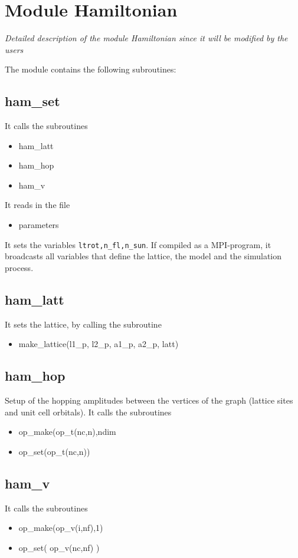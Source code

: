\section{Module Hamiltonian}
\textit{Detailed description of the module Hamiltonian since it will be modified by the users}

The module contains the following subroutines:
\subsection{ham\_set}
It calls the subroutines
\begin{itemize}
\item ham\_latt
\item ham\_hop
\item ham\_v
\end{itemize}
It reads in the file
\begin{itemize}
\item parameters
\end{itemize}
It sets the variables {\tt ltrot,n\_fl,n\_sun}.
If compiled as a MPI-program, it broadcasts all variables that define the lattice, the model and the simulation process.


\subsection{ham\_latt}
It sets the lattice, by calling the subroutine
\begin{itemize}
\item make\_lattice(l1\_p, l2\_p, a1\_p,  a2\_p, latt)
\end{itemize}

\subsection{ham\_hop}
Setup of the hopping amplitudes between the vertices of the graph (lattice sites and unit cell orbitals). 
It calls the subroutines
\begin{itemize}
\item op\_make(op\_t(nc,n),ndim
\item op\_set(op\_t(nc,n))
\end{itemize}

\subsection{ham\_v}
It calls the subroutines
\begin{itemize}
\item op\_make(op\_v(i,nf),1)
\item op\_set( op\_v(nc,nf) )
\end{itemize}
